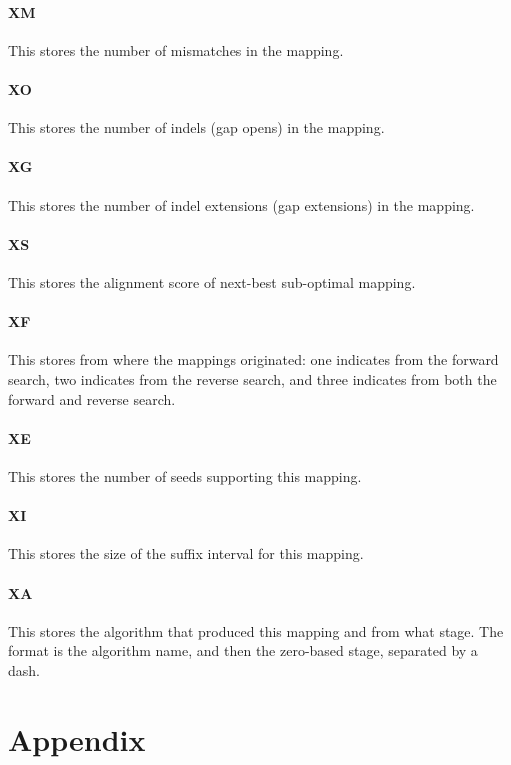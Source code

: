 \documentclass[a4paper,12pt]{book}
\begin{document}
\subsubsection{XM}
This stores the number of mismatches in the mapping.

\subsubsection{XO}
This stores the number of indels (gap opens) in the mapping.

\subsubsection{XG}
This stores the number of indel extensions (gap extensions) in the mapping.

\subsubsection{XS}
This stores the alignment score of next-best sub-optimal mapping.

\subsubsection{XF}
This stores from where the mappings originated: one indicates from the forward search, two indicates from the reverse search, and three indicates from both the forward and reverse search.

\subsubsection{XE}
This stores the number of seeds supporting this mapping.

\subsubsection{XI}
This stores the size of the suffix interval for this mapping.

\subsubsection{XA}
This stores the algorithm that produced this mapping and from what stage.
The format is the algorithm name, and then the zero-based stage, separated by a dash.

\chapter{Appendix}

{}


\end{document}
